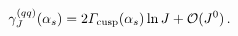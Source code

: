 \begin{equation}
\gamma_J^{(qq)} (\alpha_s)
= 2 {\mit\Gamma}_{\rm cusp} (\alpha_s) \ln J + {\cal O} (J^0)
\,.
\label{gamma-as}
\end{equation}


